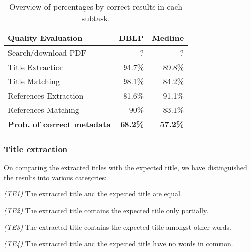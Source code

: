 \vspace{-1mm}
\begin{table}[ht]
\centering
{\renewcommand{\baselinestretch}{1.3}\normalsize
\hspace*{-2.5mm}
\begin{tabular}{|l|r|r|} \hline
Quality Evaluation & \multicolumn{1}{c|}{DBLP} & \multicolumn{1}{c|}{Medline}  \\ \hline
Search/download PDF   & ?      &    ?   \\
Title Extraction      & 94.7\% & 89.8\% \\
Title Matching        & 98.1\% & 84.2\% \\
References Extraction & 81.6\% & 91.1\% \\
References Matching   &   90\% & 83.1\% \\ \hline \hline
\textbf{Prob. of correct metadata} & \textbf{68.2\%} & \textbf{57.2\%} \\
\hline
\end{tabular}}
\vspace{-3mm}
\caption{Overview of percentages by correct results in each subtask. }
\label{table:title-extraction-quality}
\vspace{-2mm}
\end{table}



\subsubsection{Title extraction}
On comparing the extracted titles with the expected title, we have distinguished the results into various categories:

\par\medskip\noindent
\textit{(TE1)} The extracted title and the expected title are equal.
\par\medskip\noindent
\textit{(TE2)} The extracted title contains the expected title only partially.
\par\medskip\noindent
\textit{(TE3)} The extracted title contains the expected title amongst other words.
\par\medskip\noindent
\textit{(TE4)} The extracted title and the expected title have no words in common.
\medskip \\

